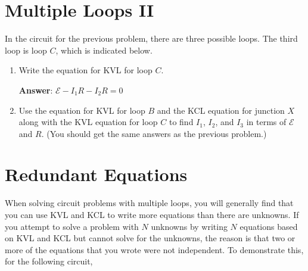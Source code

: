\documentclass{article}
\begin{document}
\section{Multiple Loops II}

In the circuit for the previous problem, there are three possible loops. The third loop is loop $C$, which is indicated below.



\begin{enumerate}

  \item Write the equation for KVL for loop $C$.

        \ifsolutions
        \textbf{Answer}: $\mathcal{E}-I_1R-I_2R=0$
        \else
        \vskip 36pt
        \fi

  \item Use the equation for KVL for loop $B$ and the KCL equation for junction $X$ along with the KVL equation for loop $C$ to find $I_1$, $I_2$, and $I_3$ in terms of $\mathcal{E}$ and $R$. (You should get the same answers as the previous problem.)

\end{enumerate}

\ifsolutions

\else

\newpage
\fi

\section{Redundant Equations}

When solving circuit problems with multiple loops, you will generally find that you can use KVL and KCL to write more equations than there are unknowns. If you attempt to solve a problem with $N$ unknowns by writing $N$ equations based on KVL and KCL but cannot solve for the unknowns, the reason is that two or more of the equations that you wrote were not independent. To demonstrate this, for the following circuit,


\end{document}
